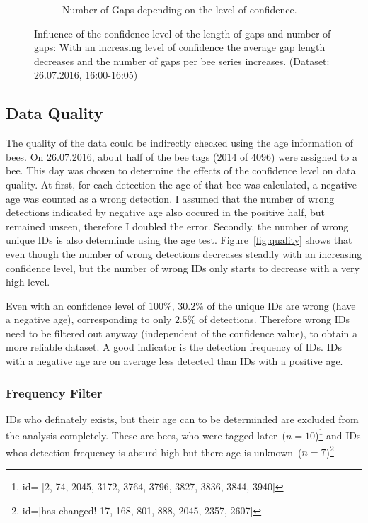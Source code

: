 \begin{figure}
\begin{subfigure}[b]{0.45\textwidth}
		\caption[Number of Gaps]{Number of Gaps depending on the level of confidence.}
		\label{fig:numgaps}
	\end{subfigure}
	\caption[Influence of Confidence Level on Gaps]{Influence of the confidence level of the length of gaps and number of gaps: With an increasing level of confidence the average gap length decreases and the number of gaps per bee series increases. (Dataset: 26.07.2016, 16:00-16:05)}
	\label{fig:gaps}
\end{figure}

\subsection{Data Quality}
\label{subsec:quality}

The quality of the data could be indirectly checked using the age information of bees. On 26.07.2016, about half of the bee tags ($2014$ of $4096$) were assigned to a bee. This day was chosen to determine the effects of the confidence level on data quality.
At first, for each detection the age of that bee was calculated, a negative age was counted as a wrong detection. I assumed that the number of wrong detections indicated by negative age also occured in the positive half, but remained unseen, therefore I doubled the error. Secondly, the number of wrong unique IDs is also determinde using the age test. Figure~\ref{fig:quality} shows that even though the number of wrong detections
decreases steadily with an increasing confidence level, but the number of wrong IDs only starts to decrease with a very high level.

Even with an confidence level of $100\%$, $30.2\%$ of the unique IDs are wrong (have a negative age), corresponding to only $2.5\%$ of detections. Therefore wrong IDs need to be filtered out anyway (independent of the confidence value), to obtain a more reliable dataset. A good indicator is the detection frequency of IDs. IDs with a negative age are on average less detected than IDs with a positive age.

\subsubsection{Frequency Filter}
IDs who definately exists, but their age can to be determinded are excluded from the analysis completely. These are bees, who were tagged later~($n=10$)\footnote{id= [2,
	74,
	2045,
	3172,
	3764,
	3796,
	3827,
	3836,
	3844,
	3940]} and IDs whos detection frequency is absurd high but there age is unknown~($n=7$)\footnote{id=[has changed! 
	17,
	168,
	801,
	888,
	2045,
	2357,
	2607]}

